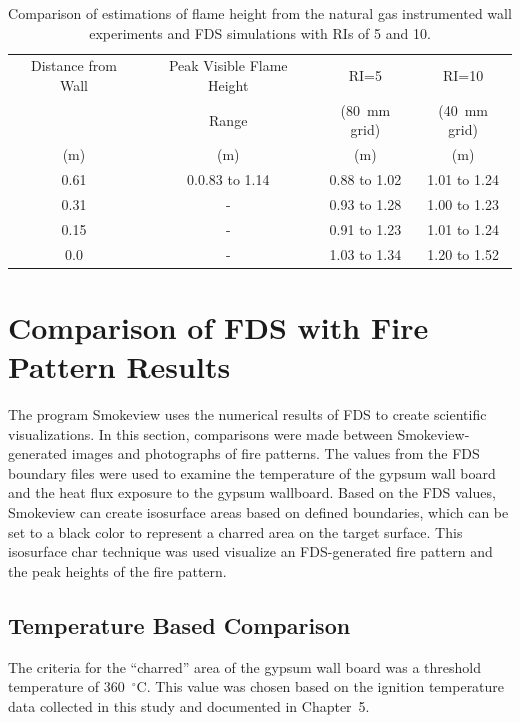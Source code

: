 \documentclass[twoside]{uocthesis}
\begin{document}
{\begin{table}[h]
  \small
  \centering
  \begin{tabular}{|c|c|c|c|} \hline 
Distance from Wall 		&  Peak Visible Flame Height 			  	& RI=5       		& RI=10      		  \\
    					&  Range          				&  (80~mm grid)  	&  (40~mm grid)  	  \\
    (m)					&  (m) 							& (m) 				& (m) 				  \\ 
\hline    0.61			&  0.0.83 to 1.14         		& 0.88 to 1.02      & 1.01 to 1.24         \\
\hline    0.31			&		-						& 0.93 to 1.28		& 1.00 to 1.23		    \\
\hline    0.15			&		-						& 0.91 to 1.23		& 1.01 to 1.24			\\
\hline	  0.0			&		-						& 1.03 to 1.34		& 1.20 to 1.52   	  \\
\hline
  \end{tabular}
  \caption[Comparison of estimations of flame height from the natural gas instrumented wall experiments and FDS simulations with RIs of 5 and 10.]{Comparison of estimations of flame height from the natural gas instrumented wall experiments and FDS simulations with RIs of 5 and 10.}
  \label{tab:FDS_FH_IWNG}
\end{table}

\section{Comparison of FDS with Fire Pattern Results}

The program Smokeview uses the numerical results of FDS to create scientific visualizations.  In this section, comparisons were made between Smokeview-generated images and photographs of fire patterns. The values from the FDS boundary files were used to examine the temperature of the gypsum wall board and the heat flux exposure to the gypsum wallboard.  Based on the FDS values, Smokeview can create isosurface areas based on defined boundaries, which can be set to a black color to represent a charred area on the target surface.  This isosurface char technique was used visualize an FDS-generated fire pattern and the peak heights of the fire pattern.

\subsection{Temperature Based Comparison}

The criteria for the ``charred'' area of the gypsum wall board was a threshold temperature of 360~$^\circ$C.  This value was chosen based on the ignition temperature data collected in this study and documented in Chapter~5. 

}
\end{document}
